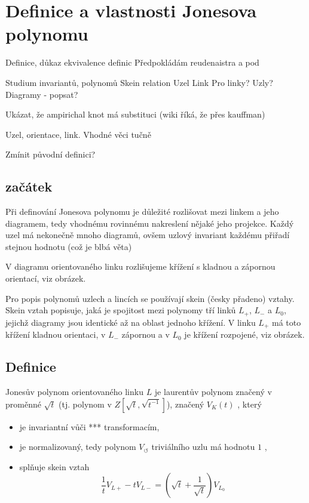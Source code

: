 
\chapter{Definice a vlastnosti Jonesova polynomu}




Definice, důkaz ekvivalence definic
Předpokládám reudenaistra a pod

Studium invariantů, polynomů
Skein relation
Uzel
Link
Pro linky? Uzly?
Diagramy - popsat?

Ukázat, že ampirichal knot má substituci (wiki říká, že přes kauffman)

Uzel, orientace, link.
Vhodné věci tučně

Zmínit původní definici?
\section{začátek}

Při definování Jonesova polynomu je důležité rozlišovat mezi linkem a jeho diagramem, tedy vhodnému rovinnému nakreslení nějaké jeho projekce. Každý uzel má nekonečně mnoho diagramů, ovšem uzlový invariant každému přiřadí stejnou hodnotu (což je blbá věta)

V diagramu orientovaného linku rozlišujeme křížení s kladnou a zápornou orientací, viz obrázek.

Pro popis polynomů uzlech a lincích se používají skein (česky přadeno) vztahy.
Skein vztah popisuje, jaká je spojitost mezi polynomy tří linků $L_+$, $ L_-$ a $L_0$, jejichž diagramy jsou identické až na oblast jednoho křížení. V linku $L_+$ má toto křížení kladnou orientaci, v $L_-$ zápornou a v $L_0$ je křížení rozpojené, viz obrázek.

\section{Definice}

\begin{definice}\label{def01:1}
Jonesův polynom orientovaného linku $L$ je laurentův polynom značený v proměnné $\sqrt t$ (tj. polynom v $Z[\sqrt t, \sqrt{t^{-1}}]$), značený $V_K(t)$ , který
\begin{itemize}
\item
je invariantní vůči *** transformacím,
\item 
  je normalizovaný, tedy polynom  $V_\circlearrowleft$ triviálního uzlu má hodnotu $1$ ,
\item  
splňuje skein vztah 
$$ \frac{1}{t} V_{L+} - t V_{L-} = (\sqrt{t}  + \frac{1}{\sqrt{t}}) V_{L_0}$$
\end{itemize}
\end{definice}

